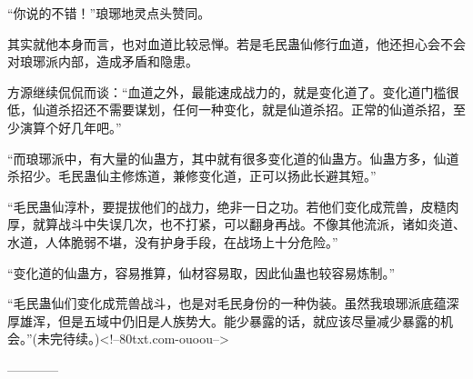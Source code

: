 \begin{this_body}
“你说的不错！”琅琊地灵点头赞同。

其实就他本身而言，也对血道比较忌惮。若是毛民蛊仙修行血道，他还担心会不会对琅琊派内部，造成矛盾和隐患。

方源继续侃侃而谈：“血道之外，最能速成战力的，就是变化道了。变化道门槛很低，仙道杀招还不需要谋划，任何一种变化，就是仙道杀招。正常的仙道杀招，至少演算个好几年吧。”

“而琅琊派中，有大量的仙蛊方，其中就有很多变化道的仙蛊方。仙蛊方多，仙道杀招少。毛民蛊仙主修炼道，兼修变化道，正可以扬此长避其短。”

“毛民蛊仙淳朴，要提拔他们的战力，绝非一日之功。若他们变化成荒兽，皮糙肉厚，就算战斗中失误几次，也不打紧，可以翻身再战。不像其他流派，诸如炎道、水道，人体脆弱不堪，没有护身手段，在战场上十分危险。”

“变化道的仙蛊方，容易推算，仙材容易取，因此仙蛊也较容易炼制。”

“毛民蛊仙们变化成荒兽战斗，也是对毛民身份的一种伪装。虽然我琅琊派底蕴深厚雄浑，但是五域中仍旧是人族势大。能少暴露的话，就应该尽量减少暴露的机会。”(未完待续。)<!--80txt.com-ouoou-->

------------

\end{this_body}

